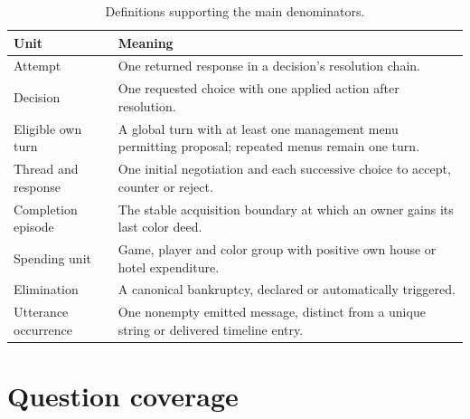 \begin{table}[htbp]
\centering\small
\begin{tabularx}{\linewidth}{L{3.0cm}Y}
\toprule Unit & Meaning\\\midrule
Attempt & One returned response in a decision's resolution chain.\\
Decision & One requested choice with one applied action after resolution.\\
Eligible own turn & A global turn with at least one management menu permitting proposal; repeated menus remain one turn.\\
Thread and response & One initial negotiation and each successive choice to accept, counter or reject.\\
Completion episode & The stable acquisition boundary at which an owner gains its last color deed.\\
Spending unit & Game, player and color group with positive own house or hotel expenditure.\\
Elimination & A canonical bankruptcy, declared or automatically triggered.\\
Utterance occurrence & One nonempty emitted message, distinct from a unique string or delivered timeline entry.\\\bottomrule
\end{tabularx}
\caption{Definitions supporting the main denominators.}
\end{table}

\clearpage
\section{Question coverage}
\label{app:coverage}

